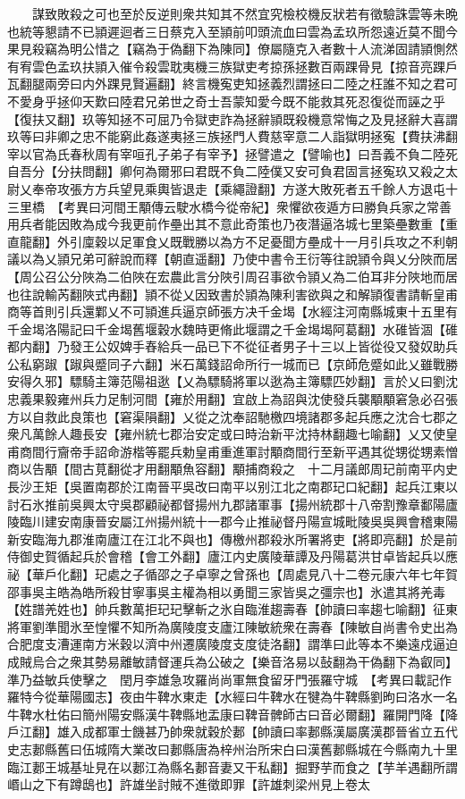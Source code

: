 　　謀致敗殺之可也至於反逆則衆共知其不然宜究檢校機反狀若有徵驗誅雲等未晩也統等懇請不已頴遲迴者三日蔡克入至頴前叩頭流血曰雲為孟玖所怨遠近莫不聞今果見殺竊為明公惜之【竊為于偽翻下為陳同】僚屬隨克入者數十人流涕固請頴惻然有宥雲色孟玖扶頴入催令殺雲耽夷機三族獄吏考掠孫拯數百兩踝骨見【掠音亮踝戶瓦翻腿兩旁曰内外踝見賢遍翻】終言機寃吏知拯義烈謂拯曰二陸之枉誰不知之君可不愛身乎拯仰天歎曰陸君兄弟世之奇士吾蒙知愛今既不能救其死忍復從而誣之乎【復扶又翻】玖等知拯不可屈乃令獄吏詐為拯辭頴既殺機意常悔之及見拯辭大喜謂玖等曰非卿之忠不能窮此姦遂夷拯三族拯門人費慈宰意二人詣獄明拯寃【費扶沸翻宰以官為氏春秋周有宰咺孔子弟子有宰予】拯譬遣之【譬喻也】曰吾義不負二陸死自吾分【分扶問翻】卿何為爾邪曰君既不負二陸僕又安可負君固言拯寃玖又殺之太尉乂奉帝攻張方方兵望見乘輿皆退走【乘繩證翻】方遂大敗死者五千餘人方退屯十三里橋　【考異曰河間王顒傳云駛水橋今從帝紀】衆懼欲夜遁方曰勝負兵家之常善用兵者能因敗為成今我更前作壘出其不意此奇策也乃夜潛逼洛城七里築壘數重【重直龍翻】外引廩穀以足軍食乂既戰勝以為方不足憂聞方壘成十一月引兵攻之不利朝議以為乂頴兄弟可辭說而釋【朝直遥翻】乃使中書令王衍等往說頴令與乂分陜而居【周公召公分陜為二伯陜在宏農此言分陜引周召事欲令頴乂為二伯耳非分陜地而居也往說輸芮翻陜式冉翻】頴不從乂因致書於頴為陳利害欲與之和解頴復書請斬皇甫商等首則引兵還鄴乂不可頴進兵逼京師張方决千金堨【水經注河南縣城東十五里有千金堨洛陽記曰千金堨舊堰穀水魏時更脩此堰謂之千金堨堨阿葛翻】水碓皆涸【碓都内翻】乃發王公奴婢手舂給兵一品已下不從征者男子十三以上皆從役又發奴助兵公私窮踧【踧與蹙同子六翻】米石萬錢詔命所行一城而已【京師危蹙如此乂雖戰勝安得久邪】驃騎主簿范陽祖逖【乂為驃騎將軍以逖為主簿驃匹妙翻】言於乂曰劉沈忠義果毅雍州兵力足制河間【雍於用翻】宜啟上為詔與沈使發兵襲顒顒窘急必召張方以自救此良策也【窘渠隕翻】乂從之沈奉詔馳檄四境諸郡多起兵應之沈合七郡之衆凡萬餘人趣長安【雍州統七郡治安定或曰時治新平沈持林翻趣七喻翻】乂又使皇甫商間行齎帝手詔命游楷等罷兵勅皇甫重進軍討顒商間行至新平遇其從甥從甥素憎商以告顒【間古莧翻從才用翻顒魚容翻】顒捕商殺之　十二月議郎周玘前南平内史長沙王矩【吳置南郡於江南晉平吳改曰南平以别江北之南郡玘口紀翻】起兵江東以討石氷推前吳興太守吳郡顧祕都督揚州九郡諸軍事【揚州統郡十八帝割豫章鄱陽廬陵臨川建安南康晉安屬江州揚州統十一郡今止推祕督丹陽宣城毗陵吳吳興會稽東陽新安臨海九郡淮南廬江在江北不與也】傳檄州郡殺氷所署將吏【將即亮翻】於是前侍御史賀循起兵於會稽【會工外翻】廬江内史廣陵華譚及丹陽葛洪甘卓皆起兵以應祕【華戶化翻】玘處之子循邵之子卓寧之曾孫也【周處見八十二卷元康六年七年賀邵事吳主皓為皓所殺甘寧事吳主權為相以勇聞三家皆吳之彊宗也】氷遣其將羌毒【姓譜羌姓也】帥兵數萬拒玘玘擊斬之氷自臨淮趨壽春【帥讀曰率趨七喻翻】征東將軍劉準聞氷至惶懼不知所為廣陵度支廬江陳敏統衆在壽春【陳敏自尚書令史出為合肥度支漕運南方米穀以濟中州遷廣陵度支度徒洛翻】謂準曰此等本不樂遠戍逼迫成賊烏合之衆其勢易離敏請督運兵為公破之【樂音洛易以鼔翻為干偽翻下為叡同】準乃益敏兵使擊之　閏月李雄急攻羅尚尚軍無食留牙門張羅守城　【考異曰載記作羅特今從華陽國志】夜由牛鞞水東走【水經曰牛鞞水在犍為牛鞞縣劉昫曰洛水一名牛鞞水杜佑曰簡州陽安縣漢牛鞞縣地盂康曰鞞音髀師古曰音必爾翻】羅開門降【降戶江翻】雄入成都軍士饑甚乃帥衆就穀於郪【帥讀曰率郪縣漢屬廣漢郡晉省立五代史志郪縣舊曰伍城隋大業改曰郪縣唐為梓州治所宋白曰漢舊郪縣城在今縣南九十里臨江郪王城基址見在以郪江為縣名郪音妻又干私翻】掘野芋而食之【芋羊遇翻所謂㟭山之下有蹲鴟也】許雄坐討賊不進徵即罪【許雄刺梁州見上卷太